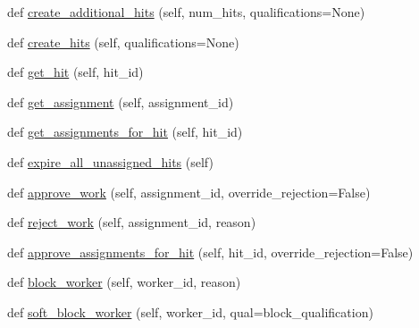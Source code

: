 \begin{DoxyCompactItemize}
\item 
def \hyperlink{classparlai_1_1mturk_1_1webapp_1_1run__mocks_1_1mock__turk__manager_1_1MockTurkManager_a50f4bb8fb3d90848da493404b5bbe6df}{create\+\_\+additional\+\_\+hits} (self, num\+\_\+hits, qualifications=None)
\item 
def \hyperlink{classparlai_1_1mturk_1_1webapp_1_1run__mocks_1_1mock__turk__manager_1_1MockTurkManager_a1dca7b716d9a3868b563101ee76f7503}{create\+\_\+hits} (self, qualifications=None)
\item 
def \hyperlink{classparlai_1_1mturk_1_1webapp_1_1run__mocks_1_1mock__turk__manager_1_1MockTurkManager_acd38f891b3fa68ddd21fc3c6fb1588bc}{get\+\_\+hit} (self, hit\+\_\+id)
\item 
def \hyperlink{classparlai_1_1mturk_1_1webapp_1_1run__mocks_1_1mock__turk__manager_1_1MockTurkManager_a0f50539551f0049aa2061acf60d26e54}{get\+\_\+assignment} (self, assignment\+\_\+id)
\item 
def \hyperlink{classparlai_1_1mturk_1_1webapp_1_1run__mocks_1_1mock__turk__manager_1_1MockTurkManager_a01939aed17ac68d1964f08a97658025b}{get\+\_\+assignments\+\_\+for\+\_\+hit} (self, hit\+\_\+id)
\item 
def \hyperlink{classparlai_1_1mturk_1_1webapp_1_1run__mocks_1_1mock__turk__manager_1_1MockTurkManager_a7e68c784f69799ce3fe4b60fc48552ba}{expire\+\_\+all\+\_\+unassigned\+\_\+hits} (self)
\item 
def \hyperlink{classparlai_1_1mturk_1_1webapp_1_1run__mocks_1_1mock__turk__manager_1_1MockTurkManager_a05fc62c918aa6f6a9d3019a653637197}{approve\+\_\+work} (self, assignment\+\_\+id, override\+\_\+rejection=False)
\item 
def \hyperlink{classparlai_1_1mturk_1_1webapp_1_1run__mocks_1_1mock__turk__manager_1_1MockTurkManager_a7efb01e7ea15145cb2373b4c2552eeca}{reject\+\_\+work} (self, assignment\+\_\+id, reason)
\item 
def \hyperlink{classparlai_1_1mturk_1_1webapp_1_1run__mocks_1_1mock__turk__manager_1_1MockTurkManager_ad6aa11f2ea976e7ec50761b59affa96d}{approve\+\_\+assignments\+\_\+for\+\_\+hit} (self, hit\+\_\+id, override\+\_\+rejection=False)
\item 
def \hyperlink{classparlai_1_1mturk_1_1webapp_1_1run__mocks_1_1mock__turk__manager_1_1MockTurkManager_a36567dd1e22f81e844fc3f4dd5826ab7}{block\+\_\+worker} (self, worker\+\_\+id, reason)
\item 
def \hyperlink{classparlai_1_1mturk_1_1webapp_1_1run__mocks_1_1mock__turk__manager_1_1MockTurkManager_a87d4a0329159fcc488e360672d8b9c56}{soft\+\_\+block\+\_\+worker} (self, worker\+\_\+id, qual=\textquotesingle{}block\+\_\+qualification\textquotesingle{})

\end{DoxyCompactItemize}
